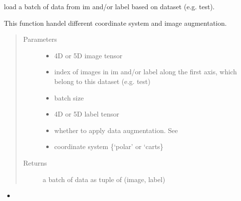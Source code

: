 \documentclass[letterpaper,10pt,english]{sphinxmanual}
\begin{document}
\begin{fulllineitems}
\label{\detokenize{index:util.load_batch.load_batch}}
load a batch of data from im and/or label based on dataset (e.g. test).

This function handel different coordinate system and image augmentation.
\begin{quote}\begin{description}
\item[{Parameters}] \leavevmode\begin{itemize}
\item {} 
 \textendash{} 4D or 5D image tensor

\item {} 
 \textendash{} index of images in im and/or label along the first axis, which belong to this dataset (e.g.  test)

\item {} 
 \textendash{} batch size

\item {} 
 \textendash{} 4D or 5D label tensor

\item {} 
 \textendash{} whether to apply data augmentation. See {\hyperref[\detokenize{index:util.load_batch.img_aug}]{}}

\item {} 
 \textendash{} coordinate system \{‘polar’ or ‘carts\}

\end{itemize}

\item[{Returns}] \leavevmode
a batch of data as tuple of (image, label)

\end{description}\end{quote}



\begin{itemize}
\item {} 
{\hyperref[\detokenize{index:util.load_batch.load_batch_parallel}]{}}

\end{itemize}



\end{fulllineitems}
\end{document}
